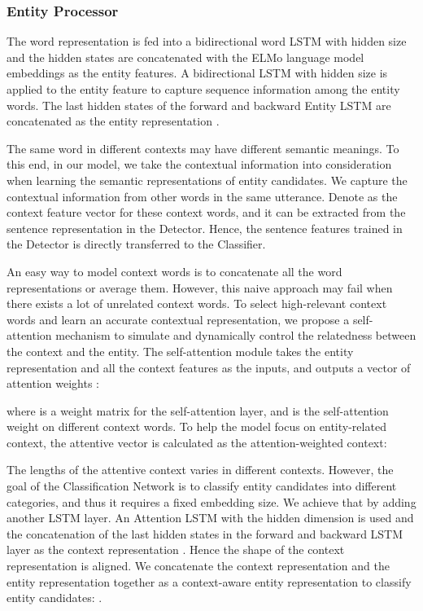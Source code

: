 \documentclass[11pt,a4paper]{article}
\begin{document}
\subsubsection{Entity Processor}
The word representation is fed into a bidirectional word LSTM with hidden size  and the hidden states are concatenated with the ELMo language model embeddings as the entity features. 
A bidirectional LSTM with hidden size  is applied to the entity feature to capture sequence information among the entity words. The last hidden states of the forward and backward Entity LSTM are concatenated as the entity representation . 

The same word in different contexts may have different semantic meanings. 
To this end, in our model, we take the contextual information into consideration when learning the semantic representations of entity candidates. 
We capture the contextual information from other words in the same utterance. Denote  as the context feature vector for these context words, and it can be extracted from the sentence representation  in the Detector.
Hence, the sentence features trained in the Detector is directly transferred to the Classifier.

An easy way to model context words is to concatenate all the word representations or average them. However, this naive approach may fail when there exists a lot of unrelated context words. To select high-relevant context words and learn an accurate contextual representation, we propose a self-attention mechanism to simulate and dynamically control the relatedness between the context and the entity.
The self-attention module takes the entity representation  and all the context features  as the inputs, and outputs a vector of attention weights :

where  is a weight matrix for the self-attention layer, and  is the self-attention weight on different context words. To help the model focus on entity-related context, the attentive vector  is calculated as the attention-weighted context:

The lengths of the attentive context  varies in different contexts. However, the goal of the Classification Network is to classify entity candidates into different categories, and thus it requires a fixed embedding size. We achieve that by adding another LSTM layer. An Attention LSTM with the hidden dimension  is used and the concatenation of the last hidden states in the forward and backward LSTM layer as the context representation . Hence the shape of the context representation is aligned.
We concatenate the context representation and the entity representation together as a context-aware entity representation to classify entity candidates: .
\end{document}
